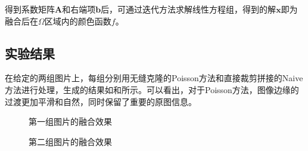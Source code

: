 \documentclass[12pt,a4paper]{article}
\begin{document}
得到系数矩阵$\mathbf{A}$和右端项$\mathbf{b}$后，可通过迭代方法求解线性方程组，得到的解$\mathbf{x}$即为融合后在$\Omega$区域内的颜色函数$f$。

\subsection{实验结果}

在给定的两组图片上，每组分别用无缝克隆的Poisson方法和直接裁剪拼接的Naive方法进行处理，生成的结果如和所示。可以看出，对于Poisson方法，图像边缘的过渡更加平滑和自然，同时保留了重要的原图信息。

\begin{figure}
    \centering
    \caption{第一组图片的融合效果}
    \label{fig:result1}
\end{figure}

\begin{figure}
    \centering
    \caption{第二组图片的融合效果}
    \label{fig:result2}
\end{figure}
\end{document}
